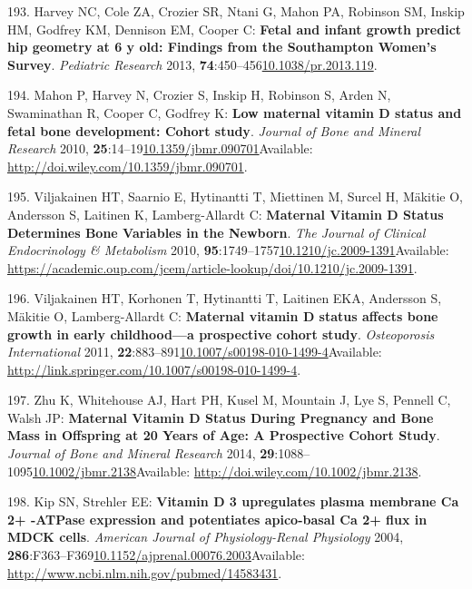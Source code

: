 \documentclass[
]{book}
\begin{document}
\leavevmode\hypertarget{ref-Harvey2013}{}%
193. Harvey NC, Cole ZA, Crozier SR, Ntani G, Mahon PA, Robinson SM, Inskip HM, Godfrey KM, Dennison EM, Cooper C: \textbf{Fetal and infant growth predict hip geometry at 6 y old: Findings from the Southampton Women's Survey}. \emph{Pediatric Research} 2013, \textbf{74}:450--456\href{https://doi.org/10.1038/pr.2013.119}{10.1038/pr.2013.119}.

\leavevmode\hypertarget{ref-Mahon2010a}{}%
194. Mahon P, Harvey N, Crozier S, Inskip H, Robinson S, Arden N, Swaminathan R, Cooper C, Godfrey K: \textbf{Low maternal vitamin D status and fetal bone development: Cohort study}. \emph{Journal of Bone and Mineral Research} 2010, \textbf{25}:14--19\href{https://doi.org/10.1359/jbmr.090701}{10.1359/jbmr.090701}Available: \url{http://doi.wiley.com/10.1359/jbmr.090701}.

\leavevmode\hypertarget{ref-Viljakainen2010}{}%
195. Viljakainen HT, Saarnio E, Hytinantti T, Miettinen M, Surcel H, Mäkitie O, Andersson S, Laitinen K, Lamberg-Allardt C: \textbf{Maternal Vitamin D Status Determines Bone Variables in the Newborn}. \emph{The Journal of Clinical Endocrinology \& Metabolism} 2010, \textbf{95}:1749--1757\href{https://doi.org/10.1210/jc.2009-1391}{10.1210/jc.2009-1391}Available: \url{https://academic.oup.com/jcem/article-lookup/doi/10.1210/jc.2009-1391}.

\leavevmode\hypertarget{ref-Viljakainen2011}{}%
196. Viljakainen HT, Korhonen T, Hytinantti T, Laitinen EKA, Andersson S, Mäkitie O, Lamberg-Allardt C: \textbf{Maternal vitamin D status affects bone growth in early childhood---a prospective cohort study}. \emph{Osteoporosis International} 2011, \textbf{22}:883--891\href{https://doi.org/10.1007/s00198-010-1499-4}{10.1007/s00198-010-1499-4}Available: \url{http://link.springer.com/10.1007/s00198-010-1499-4}.

\leavevmode\hypertarget{ref-Zhu2014a}{}%
197. Zhu K, Whitehouse AJ, Hart PH, Kusel M, Mountain J, Lye S, Pennell C, Walsh JP: \textbf{Maternal Vitamin D Status During Pregnancy and Bone Mass in Offspring at 20 Years of Age: A Prospective Cohort Study}. \emph{Journal of Bone and Mineral Research} 2014, \textbf{29}:1088--1095\href{https://doi.org/10.1002/jbmr.2138}{10.1002/jbmr.2138}Available: \url{http://doi.wiley.com/10.1002/jbmr.2138}.

\leavevmode\hypertarget{ref-Kip2004}{}%
198. Kip SN, Strehler EE: \textbf{Vitamin D 3 upregulates plasma membrane Ca 2+ -ATPase expression and potentiates apico-basal Ca 2+ flux in MDCK cells}. \emph{American Journal of Physiology-Renal Physiology} 2004, \textbf{286}:F363--F369\href{https://doi.org/10.1152/ajprenal.00076.2003}{10.1152/ajprenal.00076.2003}Available: \url{http://www.ncbi.nlm.nih.gov/pubmed/14583431}.
\end{document}

